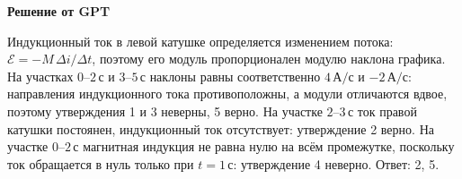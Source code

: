 \documentclass[12pt,a4paper]{article}
\begin{document}
{\begin{center}
\end{center}
}{
\smallskip\noindent\textbf{Решение от GPT}\par
Индукционный ток в левой катушке определяется изменением потока: $\mathcal E=-M\,\Delta i/\Delta t$, поэтому его модуль пропорционален модулю наклона графика. На участках $0$–$2\,\text{с}$ и $3$–$5\,\text{с}$ наклоны равны соответственно $4\,\text{А/с}$ и $-2\,\text{А/с}$: направления индукционного тока противоположны, а модули отличаются вдвое, поэтому утверждения 1 и 3 неверны, 5 верно. На участке $2$–$3\,\text{с}$ ток правой катушки постоянен, индукционный ток отсутствует: утверждение 2 верно. На участке $0$–$2\,\text{с}$ магнитная индукция не равна нулю на всём промежутке, поскольку ток обращается в нуль только при $t=1\,\text{с}$: утверждение 4 неверно. Ответ: 2, 5.
}
\end{document}
